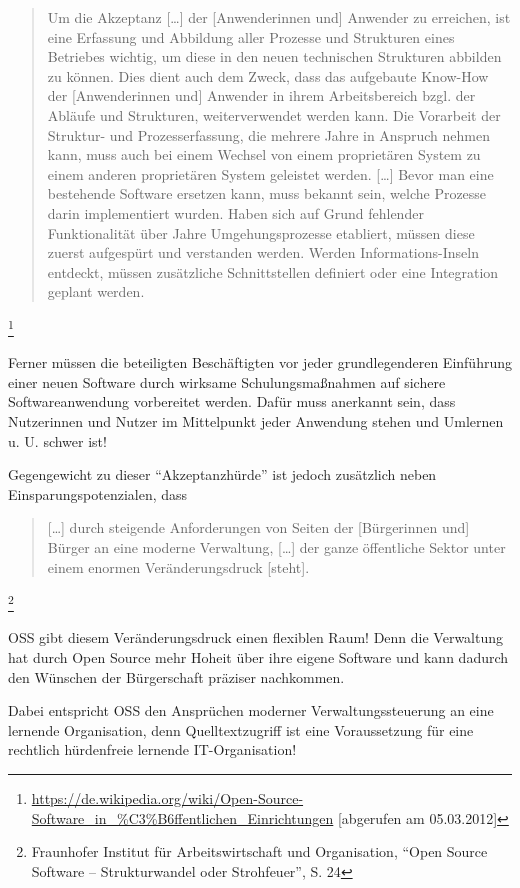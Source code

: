 \documentclass[a4paper]{scrartcl}
\begin{document}
\begin{quote}Um die Akzeptanz [\ldots] der [Anwenderinnen und] Anwender zu
  erreichen, ist eine Erfassung und Abbildung aller Prozesse und Strukturen
  eines Betriebes wichtig, um diese in den neuen technischen Strukturen abbilden
  zu können. Dies dient auch dem Zweck, dass das aufgebaute Know-How der
  [Anwenderinnen und] Anwender in ihrem Arbeitsbereich bzgl. der Abläufe und
  Strukturen, weiterverwendet werden kann. Die Vorarbeit der Struktur- und
  Prozesserfassung, die mehrere Jahre in Anspruch nehmen kann, muss auch bei
  einem Wechsel von einem proprietären System zu einem anderen proprietären
  System geleistet werden. [{\dots}] Bevor man eine bestehende Software ersetzen
  kann, muss bekannt sein, welche Prozesse darin implementiert wurden.  Haben
  sich auf Grund fehlender Funktionalität über Jahre Umgehungsprozesse
  etabliert, müssen diese zuerst aufgespürt und verstanden werden. Werden
  Informations-Inseln entdeckt, müssen zusätzliche Schnittstellen definiert oder
  eine Integration geplant
  werden.\end{quote}\footnote{\href{https://de.wikipedia.org/wiki/Open-Source-Software_in_?ffentlichen_Einrichtungen}{{https://de.wikipedia.org/wiki/Open-Source-Software\_in\_\%C3\%B6ffentlichen\_Einrichtungen}}
  [abgerufen am 05.03.2012]}

Ferner müssen die beteiligten Beschäftigten vor jeder grundlegenderen Einführung
einer neuen Software durch wirksame Schulungsmaßnahmen auf sichere
Softwareanwendung vorbereitet werden. Dafür muss anerkannt sein, dass
Nutzerinnen und Nutzer im Mittelpunkt jeder Anwendung stehen und Umlernen
u. U. schwer ist!

Gegengewicht zu dieser ``Akzeptanzhürde'' ist jedoch zusätzlich neben
Einsparungspotenzialen, dass \begin{quote} [\ldots] durch steigende
  Anforderungen von Seiten der [Bürgerinnen und] Bürger an eine moderne
  Verwaltung, [\ldots] der ganze öffentliche Sektor unter einem enormen
  Veränderungsdruck [steht].\end{quote}\footnote{Fraunhofer Institut für
  Arbeitswirtschaft und Organisation, ``Open Source Software -- Strukturwandel
  oder Strohfeuer'', S. 24}

OSS gibt diesem Veränderungsdruck einen flexiblen Raum! Denn die Verwaltung hat
durch Open Source mehr Hoheit über ihre eigene Software und kann dadurch den
Wünschen der Bürgerschaft präziser nachkommen.

Dabei entspricht OSS den Ansprüchen moderner Verwaltungssteuerung an eine
lernende Organisation, denn Quelltextzugriff ist eine Voraussetzung für eine
rechtlich hürdenfreie lernende IT-Organisation!
\end{document}
